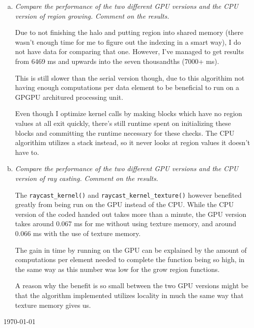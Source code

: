 \documentclass[fontsize=11pt, paper=a4, titlepage]{article}
\begin{document}
\begin{enumerate}[a)]
\begin{enumerate}[I)]
    \end{enumerate}

    \item \textit{Compare the performance of the two different GPU versions and
the CPU version of region growing. Comment on the results.}

Due to not finishing the halo and putting region into shared memory (there
wasn't enough time for me to figure out the indexing in a smart way), I do not
have data for comparing that one. However, I've managed to get results from 6469 ms and
upwards into the seven thousandths (7000+ ms).

This is still slower than the serial version though, due to this algorithim not
having enough computations per data element to be beneficial to run on a GPGPU
architured processing unit.

Even though I optimize kernel calls by making blocks which have no region values
at all exit quickly, there's still runtime spent on initializing these blocks
and committing the runtime necessary for these checks. The CPU algorithim
utilizes a stack instead, so it never looks at region values it doesn't have to.

    \item \textit{Compare the performance of the two different GPU versions and
the CPU version of ray casting. Comment on the results.}

The \verb#raycast_kernel()# and \verb#raycast_kernel_texture()# however
benefited greatly from being run on the GPU instead of the CPU. While the CPU
version of the coded handed out takes more than a minute, the GPU version takes
around 0.067 ms for me without using texture memory, and around 0.066 ms with
the use of texture memory.

The gain in time by running on the GPU can be explained by the amount of
computations per element needed to complete the function being so high, in the
same way as this number was low for the grow region functions.

A reason why the benefit is so small between the two GPU versions might be that
the algorithm implemented utilizes locality in much the same way that texture
memory gives us.

\end{enumerate}

\vfill
\hfill \large{\today}
\end{document}
